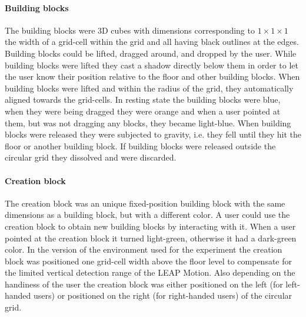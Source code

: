 \paragraph{Building blocks}
The building blocks were 3D cubes with dimensions corresponding to $1\times 1\times 1$ the width of a grid-cell within the grid and all having black outlines at the edges. Building blocks could be lifted, dragged around, and dropped by the user. While building blocks were lifted they cast a shadow directly below them in order to let the user know their position relative to the floor and other building blocks. When building blocks were lifted and within the radius of the grid, they automatically aligned towards the grid-cells. In resting state the building blocks were blue, when they were being dragged they were orange and when a user pointed at them, but was not dragging any blocks, they became light-blue. When building blocks were released they were subjected to gravity, i.e. they fell until they hit the floor or another building block. If building blocks were released outside the circular grid they dissolved and were discarded.

\paragraph{Creation block}
The creation block was an unique fixed-position building block with the same dimensions as a building block, but with a different color. A user could use the creation block to obtain new building blocks by interacting with it. When a user pointed at the creation block it turned light-green, otherwise it had a dark-green color. In the version of the environment used for the experiment the creation block was positioned one grid-cell width above the floor level to compensate for the limited vertical detection range of the LEAP Motion. Also depending on the handiness of the user the creation block was either positioned on the left (for left-handed users) or positioned on the right (for right-handed users) of the circular grid.


